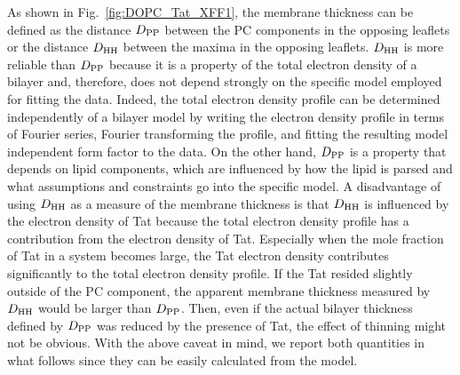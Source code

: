 As shown in Fig.~\ref{fig:DOPC_Tat_XFF1}, the membrane thickness can be defined
as the distance $D_\textrm{PP}$ between the PC components in the opposing leaflets
or the distance $D_\textrm{HH}$ between the maxima in the opposing leaflets. $D_\textrm{HH}$
is more reliable than $D_\textrm{PP}$ because it is a property of the total 
electron density of a bilayer and, therefore, does not depend strongly on the 
specific model employed for fitting the data. Indeed, the total electron
density profile can be determined independently of a bilayer model 
by writing the electron density profile in terms of Fourier series, Fourier transforming
the profile, and fitting the resulting model independent
form factor to the data. On the other hand, $D_\textrm{PP}$ is a property that
depends on lipid components, which are influenced by how the lipid is parsed 
and what assumptions and constraints go into the specific model.
A disadvantage of using $D_\textrm{HH}$ as a measure of the membrane thickness is
that $D_\textrm{HH}$ is influenced by the electron density of Tat because 
the total electron density profile has a contribution from the electron density of Tat. 
Especially 
when the mole fraction of Tat in a system becomes large, 
the Tat electron density contributes significantly to the total electron 
density profile. If the Tat resided slightly 
outside of the PC component, the apparent membrane thickness measured by $D_\textrm{HH}$
would be larger than $D_\textrm{PP}$. Then, even if the actual bilayer thickness defined by $D_\textrm{PP}$ 
was reduced by the presence of Tat, the effect of thinning might not be obvious. 
With the above caveat in mind, we report both quantities in what follows
since they can be easily calculated from the model.


